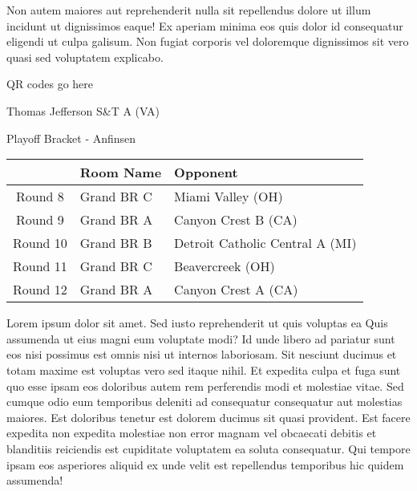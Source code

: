 \documentclass{article}%
\begin{document}
\newline%
Non autem maiores aut reprehenderit nulla sit repellendus dolore ut illum incidunt ut dignissimos eaque! Ex aperiam minima eos quis dolor id consequatur eligendi ut culpa galisum. Non fugiat corporis vel doloremque dignissimos sit vero quasi sed voluptatem explicabo.\newline%
\newline%
%
\vspace*{30pt}%
\begin{center}%
\begin{Huge}%
QR codes go here%
\end{Huge}%
\end{center}%
\newpage%
\begin{center}%
\begin{Huge}%
Thomas Jefferson S\&T A (VA)%
\end{Huge}%
\vspace*{8pt}%
\linebreak%
\begin{Large}%
Playoff Bracket {-} Anfinsen%
\end{Large}%
\end{center}%
\begin{tabularx}{\textwidth}{|c|Y|Y|}%
\hline%
&Room Name&Opponent\\%
\hline%
Round 8&Grand BR C&Miami Valley (OH)\\%
Round 9&Grand BR A&Canyon Crest B (CA)\\%
Round 10&Grand BR B&Detroit Catholic Central A (MI)\\%
Round 11&Grand BR C&Beavercreek (OH)\\%
Round 12&Grand BR A&Canyon Crest A (CA)\\%
\hline%
\end{tabularx}%
\vspace*{8pt}%
\linebreak%
\newline%
\newline%
Lorem ipsum dolor sit amet. Sed iusto reprehenderit ut quis voluptas ea Quis assumenda ut eius magni eum voluptate modi? Id unde libero ad pariatur sunt eos nisi possimus est omnis nisi ut internos laboriosam. Sit nesciunt ducimus et totam maxime est voluptas vero sed itaque nihil. Et expedita culpa et fuga sunt quo esse ipsam eos doloribus autem rem perferendis modi et molestiae vitae.\newline%
\newline%
Sed cumque odio eum temporibus deleniti ad consequatur consequatur aut molestias maiores. Est doloribus tenetur est dolorem ducimus sit quasi provident. Est facere expedita non expedita molestiae non error magnam vel obcaecati debitis et blanditiis reiciendis est cupiditate voluptatem ea soluta consequatur. Qui tempore ipsam eos asperiores aliquid ex unde velit est repellendus temporibus hic quidem assumenda!\newline%
\end{document}
